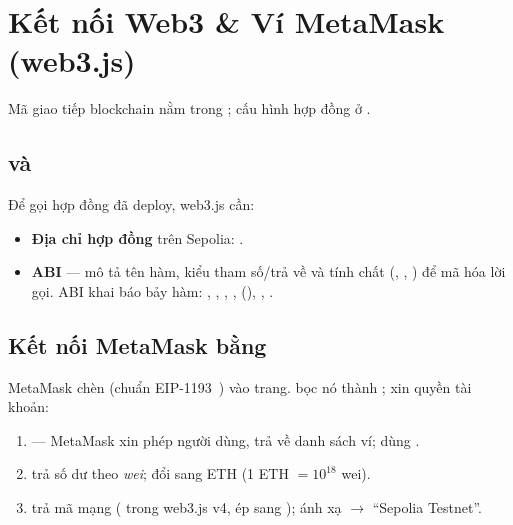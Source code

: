 \section{Kết nối Web3 \& Ví MetaMask (web3.js)}
\label{sec:ch4}

Mã giao tiếp blockchain nằm trong ; cấu hình hợp đồng ở .

\subsection{ và }

Để gọi hợp đồng đã deploy, web3.js cần:
\begin{itemize}[leftmargin=1.5em]
    \item \textbf{Địa chỉ hợp đồng} trên Sepolia: .
    \item \textbf{ABI} --- mô tả tên hàm, kiểu tham số/trả về và tính chất (, , ) để mã hóa lời gọi.
          ABI khai báo bảy hàm: , , , , 
          (), , .
\end{itemize}



\subsection{Kết nối MetaMask bằng }

MetaMask chèn  (chuẩn EIP-1193~\cite{eip1193}) vào trang.  bọc nó thành ;
 xin quyền tài khoản:



\begin{enumerate}[leftmargin=1.8em]
    \item {} --- MetaMask xin phép người dùng, trả về danh sách ví; dùng .
    \item {} trả số dư theo \emph{wei};  đổi sang ETH (1 ETH $=10^{18}$ wei).
    \item {} trả mã mạng ( trong web3.js v4, ép sang );  ánh xạ
           $\to$ ``Sepolia Testnet''.
\end{enumerate}

